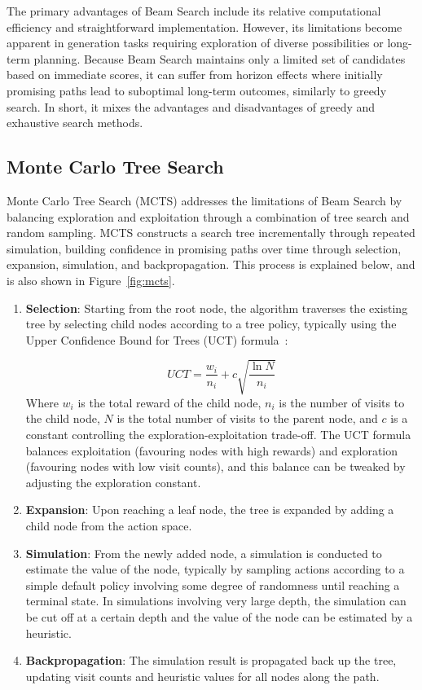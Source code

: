 The primary advantages of Beam Search include its relative computational efficiency and straightforward implementation. However, its limitations become apparent in generation tasks requiring exploration of diverse possibilities or long-term planning. Because Beam Search maintains only a limited set of candidates based on immediate scores, it can suffer from horizon effects where initially promising paths lead to suboptimal long-term outcomes, similarly to greedy search. In short, it mixes the advantages and disadvantages of greedy and exhaustive search methods.

\subsection{Monte Carlo Tree Search}
Monte Carlo Tree Search (MCTS) addresses the limitations of Beam Search by balancing exploration and exploitation through a combination of tree search and random sampling. MCTS constructs a search tree incrementally through repeated simulation, building confidence in promising paths over time through selection, expansion, simulation, and backpropagation. This process is explained below, and is also shown in Figure~\ref{fig:mcts}.

\begin{enumerate}
\item \textbf{Selection}: Starting from the root node, the algorithm traverses the existing tree by selecting child nodes according to a tree policy, typically using the Upper Confidence Bound for Trees (UCT) formula~\citep{Kocsis2006UCT}:

\begin{equation}
UCT = \frac{w_i}{n_i} + c\sqrt{\frac{\ln{N}}{n_i}}
\end{equation}
Where $w_i$ is the total reward of the child node, $n_i$ is the number of visits to the child node, $N$ is the total number of visits to the parent node, and $c$ is a constant controlling the exploration-exploitation trade-off. The UCT formula balances exploitation (favouring nodes with high rewards) and exploration (favouring nodes with low visit counts), and this balance can be tweaked by adjusting the exploration constant.

\item \textbf{Expansion}: Upon reaching a leaf node, the tree is expanded by adding a child node from the action space.

\item \textbf{Simulation}: From the newly added node, a simulation is conducted to estimate the value of the node, typically by sampling actions according to a simple default policy involving some degree of randomness until reaching a terminal state. In simulations involving very large depth, the simulation can be cut off at a certain depth and the value of the node can be estimated by a heuristic.

\item \textbf{Backpropagation}: The simulation result is propagated back up the tree, updating visit counts and heuristic values for all nodes along the path.
\end{enumerate}

